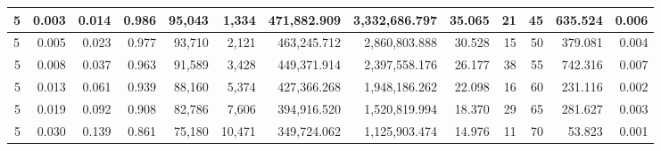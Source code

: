 \documentclass[fontsize=11pt]{article}
\begin{document}
\begin{landscape}
\begin{table}[]
\begin{tabular}{lrrrrrrrrrr|r|r|}
\multicolumn{1}{|l|}{5} & \multicolumn{1}{r|}{0.003} & \multicolumn{1}{r|}{0.014} & \multicolumn{1}{r|}{0.986} & \multicolumn{1}{r|}{95,043}  & \multicolumn{1}{r|}{1,334}  & \multicolumn{1}{r|}{471,882.909} & \multicolumn{1}{r|}{3,332,686.797} & \multicolumn{1}{r|}{35.065} & \multicolumn{1}{r|}{21}    & 45                     & 635.524                                  & 0.006                               \\ \hline
\multicolumn{1}{|l|}{5} & \multicolumn{1}{r|}{0.005} & \multicolumn{1}{r|}{0.023} & \multicolumn{1}{r|}{0.977} & \multicolumn{1}{r|}{93,710}  & \multicolumn{1}{r|}{2,121}  & \multicolumn{1}{r|}{463,245.712} & \multicolumn{1}{r|}{2,860,803.888} & \multicolumn{1}{r|}{30.528} & \multicolumn{1}{r|}{15}    & 50                     & 379.081                                  & 0.004                               \\ \hline
\multicolumn{1}{|r|}{5} & \multicolumn{1}{r|}{0.008} & \multicolumn{1}{r|}{0.037} & \multicolumn{1}{r|}{0.963} & \multicolumn{1}{r|}{91,589}  & \multicolumn{1}{r|}{3,428}  & \multicolumn{1}{r|}{449,371.914} & \multicolumn{1}{r|}{2,397,558.176} & \multicolumn{1}{r|}{26.177} & \multicolumn{1}{r|}{38}    & 55                     & 742.316                                  & 0.007                               \\ \hline
\multicolumn{1}{|r|}{5} & \multicolumn{1}{r|}{0.013} & \multicolumn{1}{r|}{0.061} & \multicolumn{1}{r|}{0.939} & \multicolumn{1}{r|}{88,160}  & \multicolumn{1}{r|}{5,374}  & \multicolumn{1}{r|}{427,366.268} & \multicolumn{1}{r|}{1,948,186.262} & \multicolumn{1}{r|}{22.098} & \multicolumn{1}{r|}{16}    & 60                     & 231.116                                  & 0.002                               \\ \hline
\multicolumn{1}{|r|}{5} & \multicolumn{1}{r|}{0.019} & \multicolumn{1}{r|}{0.092} & \multicolumn{1}{r|}{0.908} & \multicolumn{1}{r|}{82,786}  & \multicolumn{1}{r|}{7,606}  & \multicolumn{1}{r|}{394,916.520} & \multicolumn{1}{r|}{1,520,819.994} & \multicolumn{1}{r|}{18.370} & \multicolumn{1}{r|}{29}    & 65                     & 281.627                                  & 0.003                               \\ \hline
\multicolumn{1}{|r|}{5} & \multicolumn{1}{r|}{0.030} & \multicolumn{1}{r|}{0.139} & \multicolumn{1}{r|}{0.861} & \multicolumn{1}{r|}{75,180}  & \multicolumn{1}{r|}{10,471} & \multicolumn{1}{r|}{349,724.062} & \multicolumn{1}{r|}{1,125,903.474} & \multicolumn{1}{r|}{14.976} & \multicolumn{1}{r|}{11}    & 70                     & 53.823                                   & 0.001                               \\ \hline

\end{tabular}
\end{table}
\end{landscape}
\end{document}
